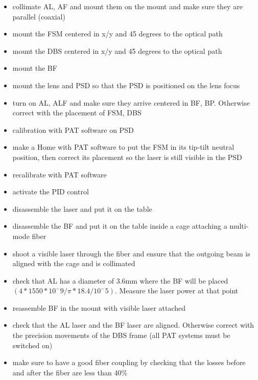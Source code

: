 \begin{itemize}
  \item collimate AL, AF and mount them on the mount and make sure they are parallel (coaxial)
  \item mount the FSM centered in x/y and 45 degrees to the optical path
  \item mount the DBS centered in x/y and 45 degrees to the optical path
  \item mount the BF
  \item mount the lens and PSD so that the PSD is positioned on the lens focus
  \item turn on AL, ALF and make sure they arrive centered in BF, BP. Otherwise correct with the placement of FSM, DBS
  \item calibration with PAT software on PSD
  \item make a Home with PAT software to put the FSM in its tip-tilt neutral position, then correct its placement so the laser is still visible in the PSD
  \item recalibrate with PAT software
  \item activate the PID control
\end{itemize}

\begin{itemize}
  \item disassemble the laser and put it on the table
  \item disassemble the BF and put it on the table inside a cage attaching a multi-mode fiber
  \item shoot a visible laser through the fiber and ensure that the outgoing beam is aligned with the cage and is collimated
  \item check that AL has a diameter of 3.6mm where the BF will be placed $(4 * 1550 * 10^-9 / \pi * 18.4 / 10^-5)$. Measure the laser power at that point
  \item reassemble BF in the mount with visible laser attached
  \item check that the AL laser and the BF laser are aligned. Otherwise correct with the precision movements of the DBS frame (all PAT systems must be switched on)
  \item make sure to have a good fiber coupling by checking that the losses before and after the fiber are less than 40\%
\end{itemize}

